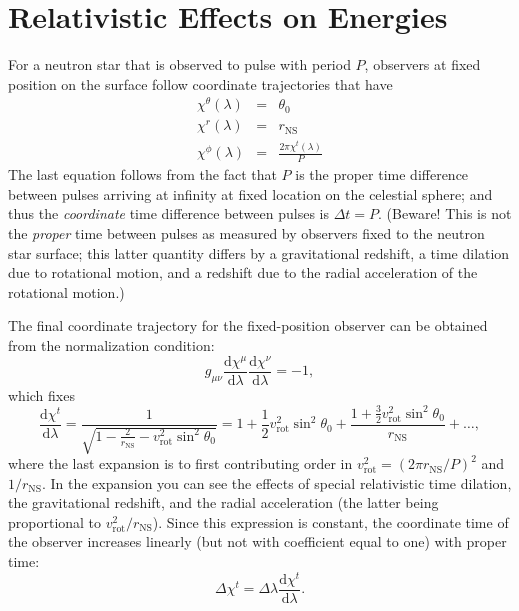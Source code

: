 \documentclass[modern]{aastex631}
\newcommand{\dd}{\mathrm{d}}
\newcommand{\rNS}{r_\mathrm{NS}}
\newcommand{\vRot}{v_\mathrm{rot}}
\begin{document}
\section{Relativistic Effects on Energies}
\label{sec:relativistic}

For a neutron star that is observed to pulse with period $P$, observers at fixed
position on the surface follow coordinate trajectories that have 
\begin{eqnarray}
    \chi^\theta\left( \lambda \right) & = & \theta_0 \\
    \chi^r\left( \lambda \right) & = & \rNS \\
    \chi^\phi\left(\lambda \right) & = & \frac{2 \pi \chi^t\left(\lambda \right)}{P}
\end{eqnarray}
The last equation follows from the fact that $P$ is the proper time difference
between pulses arriving at infinity at fixed location on the celestial sphere;
and thus the \emph{coordinate} time difference between pulses is $\Delta t = P$.
(Beware!  This is not the \emph{proper} time between pulses as measured by
observers fixed to the neutron star surface; this latter quantity differs by a
gravitational redshift, a time dilation due to rotational motion, and a redshift
due to the radial acceleration of the rotational motion.)

The final coordinate trajectory for the fixed-position observer can be obtained
from the normalization condition:
\begin{equation}
    g_{\mu\nu} \frac{\dd \chi^\mu}{\dd \lambda} \frac{\dd \chi^\nu}{\dd \lambda} = -1,
\end{equation}
which fixes 
\begin{equation}
    \frac{\dd \chi^t}{\dd \lambda} = \frac{1}{\sqrt{1 - \frac{2}{\rNS} - \vRot^2 \sin^2 \theta_0}} = 1 + \frac{1}{2}  \vRot^2 \sin^2 \theta_0 + \frac{1 + \frac{3}{2} \vRot^2 \sin^2 \theta_0}{\rNS} + \ldots,
\end{equation}
where the last expansion is to first contributing order in $\vRot^2 = \left( 2
\pi \rNS / P \right)^2$ and $1/\rNS$.  In the expansion you can see the effects
of special relativistic time dilation, the gravitational redshift, and the
radial acceleration (the latter being proportional to $\vRot^2 / \rNS$).  Since
this expression is constant, the coordinate time of the observer increases
linearly (but not with coefficient equal to one) with proper time:
\begin{equation}
    \Delta \chi^t = \Delta \lambda \frac{\dd \chi^t}{\dd \lambda}.
\end{equation}
\end{document}
